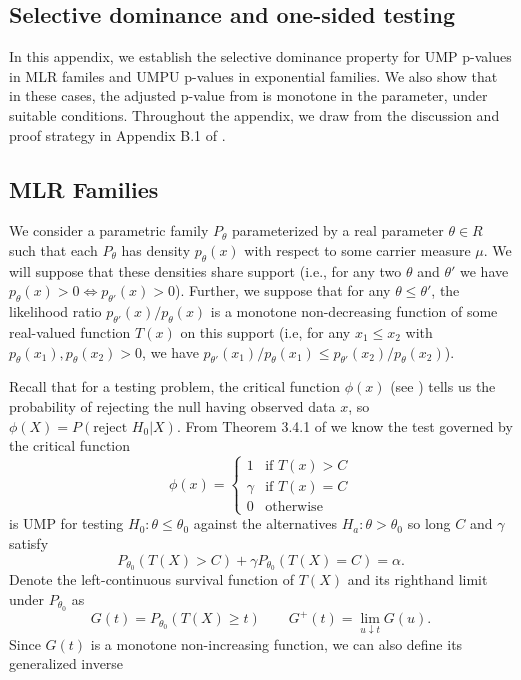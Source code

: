 \documentclass{article}
\begin{document}
\begin{appendix}
\section{Selective dominance and one-sided testing}
\label{sec:one_sided_appdx}

In this appendix, we establish the selective dominance property for UMP p-values in MLR familes and UMPU p-values in exponential families. We also show that in these cases, the adjusted p-value from  is monotone in the parameter, under suitable conditions. Throughout the appendix, we draw from the discussion and proof strategy in Appendix B.1 of \cite{Lei}.

\subsection{MLR Families}
\label{sec:one_sided_mlr_appdx}

We consider a parametric family $P_{\theta}$ parameterized by a real parameter $\theta \in R$ such that each $P_{\theta}$ has density $p_{\theta}(x)$ with respect to some carrier measure $\mu$. We will suppose that these densities share support (i.e., for any two $\theta$ and $\theta'$ we have $p_{\theta}(x) > 0 \iff p_{\theta'}(x)> 0$). Further, we suppose that for any $\theta \leq \theta'$, the likelihood ratio $p_{\theta'}(x)/p_{\theta}(x)$ is a monotone non-decreasing function of some real-valued function $T(x)$ on this support (i.e, for any $x_1 \leq x_2$ with $p_{\theta}(x_1), p_{\theta}(x_2) > 0$, we have $p_{\theta'}(x_1)/p_{\theta}(x_1) \leq p_{\theta'}(x_2)/p_{\theta}(x_2)$). 

Recall that for a testing problem, the critical function $\phi(x)$ (see \cite[Section 3.1]{Lehmann}) tells us the probability of rejecting the null having observed data $x$, so $\phi(X) = P(\text{reject } H_0 | X)$. From Theorem 3.4.1 of \cite{Lehmann} we know the test governed by the critical function 
\begin{equation}
    \label{eq:mlr_test}
    \phi(x) = \begin{cases}
        1 &\text{if } T(x) > C  \\
        \gamma &\text{if } T(x) = C  \\
        0 & \text{otherwise }
    \end{cases}
\end{equation}
is UMP for testing $H_0 : \theta \leq \theta_0$ against the alternatives $H_a : \theta > \theta_0 $ so long $C$ and $\gamma$ satisfy
\begin{equation}
    \label{eq:constraint}
    P_{\theta_0}(T(X) > C) + \gamma P_{\theta_0}(T(X) = C) = \alpha.
\end{equation}
Denote the left-continuous survival function of $T(X)$ and its righthand limit under $P_{\theta_0}$ as
\begin{equation*}
    G(t) = P_{\theta_0}(T(X) \geq t) \qquad G^+(t) = \lim_{u \downarrow t} G(u).
\end{equation*}
Since $G(t)$ is a monotone non-increasing function, we can also define its generalized inverse 


\end{appendix}
\end{document}
